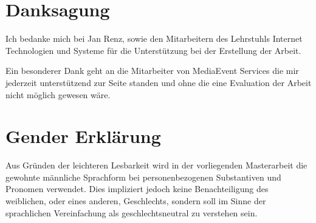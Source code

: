 \chapter*{Danksagung}
Ich bedanke mich bei Jan Renz, sowie den Mitarbeitern des Lehrstuhls Internet Technologien und Systeme für die Unterstützung bei der Erstellung der Arbeit.

Ein besonderer Dank geht an die Mitarbeiter von MediaEvent Services die mir jederzeit unterstützend zur Seite standen und ohne die eine Evaluation der Arbeit nicht möglich gewesen wäre.

\chapter*{Gender Erklärung}

Aus Gründen der leichteren Lesbarkeit wird in der vorliegenden Masterarbeit die gewohnte männliche Sprachform bei personenbezogenen Substantiven und Pronomen verwendet. Dies impliziert jedoch keine Benachteiligung des weiblichen, oder eines anderen, Geschlechts, sondern soll im Sinne der sprachlichen Vereinfachung als geschlechtsneutral zu verstehen sein.